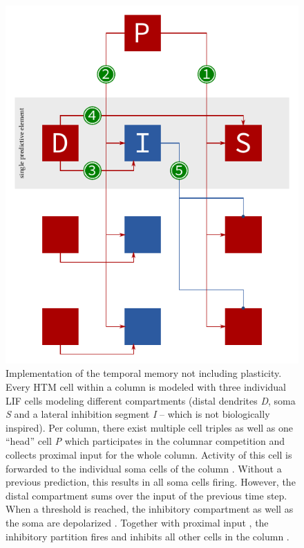 \begin{figure}
	\begin{center}
		\includegraphics{../circuitry/column.pdf}
	\end{center}
	\caption{Implementation of the temporal memory not including plasticity. Every HTM cell within a column is modeled with three individual LIF cells modeling different compartments (distal dendrites \emph{D}, soma \emph{S} and a lateral inhibition segment \emph{I} -- which is not biologically inspired). Per column, there exist multiple cell triples as well as one ``head'' cell \emph{P} which participates in the columnar competition and collects proximal input for the whole column. Activity of this cell is forwarded to the individual soma cells of the column \protect{}. Without a previous prediction, this results in all soma cells firing. However, the distal compartment sums over the input of the previous time step. When a threshold is reached, the inhibitory compartment as well as the soma are depolarized \protect{} \protect{}. Together with proximal input \protect{}, the inhibitory partition fires and inhibits all other cells in the column \protect{}.}
	\label{fig:temporal_memory}
\end{figure}


